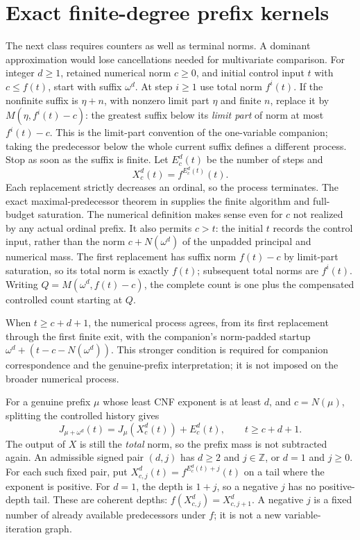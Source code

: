 \documentclass[11pt]{article}
\begin{document}
\section{Exact finite-degree prefix kernels}
The next class requires counters as well as terminal norms. A dominant
approximation would lose cancellations needed for multivariate comparison.
For integer $d\ge1$, retained numerical norm $c\ge0$, and initial control
input $t$ with $c\le f(t)$, start with suffix $\omega^d$.
At step $i\ge1$ use total norm $f^i(t)$. If the nonfinite suffix is $\eta+n$, with nonzero limit
part $\eta$ and finite $n$, replace it by $M(\eta,f^i(t)-c)$: the greatest
suffix below its \emph{limit part} of norm at most $f^i(t)-c$.
This is the limit-part convention of the one-variable companion; taking
the predecessor below the whole current suffix defines a different process.
Stop as soon as the suffix is finite. Let $E^d_c(t)$ be the number of
steps and
\[
 X^d_c(t)=f^{E^d_c(t)}(t).
\]
Each replacement strictly decreases an ordinal, so the process terminates.
The exact maximal-predecessor theorem in \cite{wwfoundations} supplies the
finite algorithm and full-budget saturation. The numerical definition makes
sense even for $c$ not realized by any actual ordinal prefix.
It also permits $c>t$: the initial $t$ records the control input, rather
than the norm $c+N(\omega^d)$ of the unpadded principal and numerical mass.
The first replacement has suffix norm $f(t)-c$ by limit-part saturation,
so its total norm is exactly $f(t)$; subsequent total norms are $f^i(t)$.
Writing $Q=M(\omega^d,f(t)-c)$, the complete count is one plus the
compensated controlled count starting at $Q$.

When $t\ge c+d+1$, the numerical process agrees, from its first replacement
through the first finite exit, with the companion's norm-padded startup
$\omega^d+(t-c-N(\omega^d))$. This stronger condition is required for
companion correspondence and the genuine-prefix interpretation; it is not
imposed on the broader numerical process.

For a genuine prefix $\mu$ whose least CNF exponent is at least $d$, and
$c=N(\mu)$, splitting the controlled history gives
\begin{equation}\label{eq:prefix}
 J_{\mu+\omega^d}(t)=J_\mu(X^d_c(t))+E^d_c(t),
       \qquad t\ge c+d+1.
\end{equation}
The output of $X$ is still the \emph{total} norm, so the prefix mass is not
subtracted again. An admissible signed pair $(d,j)$ has $d\ge2$ and
$j\in\mathbb Z$, or $d=1$ and $j\ge0$. For each such fixed pair, put
$X^d_{c,j}(t)=f^{E^d_c(t)+j}(t)$ on a tail where the exponent is positive.
For $d=1$, the depth is $1+j$, so a negative $j$ has no positive-depth tail.
These are coherent depths: $f(X^d_{c,j})=X^d_{c,j+1}$. A negative $j$ is a
fixed number of already available predecessors under $f$; it is not a new
variable-iteration graph.
\end{document}

